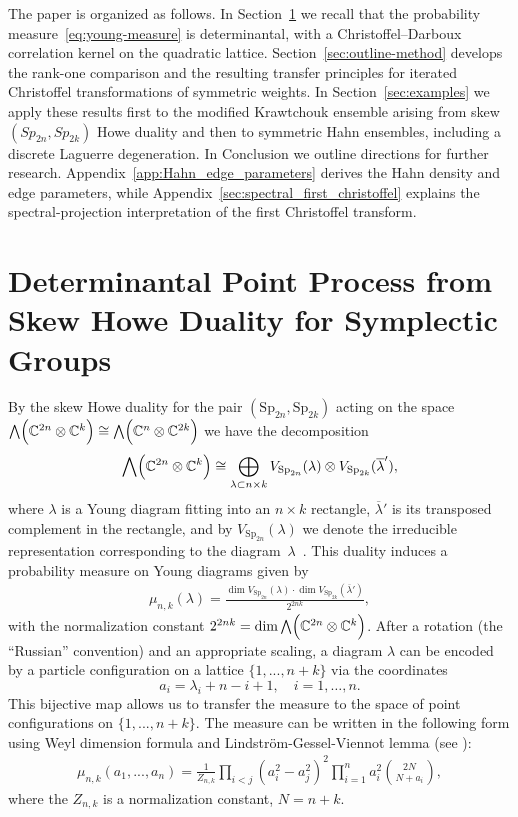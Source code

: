 \documentclass[reqno,11pt]{amsart}
\newcommand{\Sp}{Sp}
\theoremstyle{plain}
\theoremstyle{definition}
\numberwithin{equation}{section}
\begin{document}
The paper is organized as follows. In Section~\ref{sec:determ-point-proc} we recall that the probability measure~\eqref{eq:young-measure} is determinantal, with a Christoffel--Darboux correlation kernel on the quadratic lattice. Section~\ref{sec:outline-method} develops the rank-one comparison and the resulting transfer principles for iterated Christoffel transformations of symmetric weights. In Section~\ref{sec:examples} we apply these results first to the modified Krawtchouk ensemble arising from skew $(\Sp_{2n},\Sp_{2k})$ Howe duality and then to symmetric Hahn ensembles, including a discrete Laguerre degeneration. In Conclusion we outline directions for further research.
Appendix~\ref{app:Hahn_edge_parameters} derives the Hahn density and edge parameters, while Appendix~\ref{sec:spectral_first_christoffel} explains the spectral-projection interpretation of the first Christoffel transform.

\section{Determinantal Point Process from Skew Howe Duality for Symplectic Groups}
\label{sec:determ-point-proc}

By the skew Howe duality for the pair \((\mathrm{Sp}_{2n},\mathrm{Sp}_{2k})\)  acting on the space 
$\bigwedge\Bigl(\mathbb{C}^{2n}\otimes\mathbb{C}^{k}\Bigr)
\cong
\bigwedge\Bigl(\mathbb{C}^{n}\otimes\mathbb{C}^{2k}\Bigr)$
we have the decomposition
\begin{align*}
\bigwedge\Bigl(\mathbb{C}^{2n}\otimes\mathbb{C}^{k}\Bigr)
\cong \bigoplus_{\lambda\subset n\times k} V_{\mathrm{Sp}_{2n}}(\lambda)\otimes V_{\mathrm{Sp}_{2k}}(\overline{\lambda}'),
\end{align*}
where \(\lambda\) is a Young diagram fitting into an \(n\times k\) rectangle, $\overline\lambda'$ is its transposed
complement in the rectangle, and by $V_{\text{Sp}_{2n}}(\lambda)$ we denote
the irreducible representation corresponding to the diagram~$\lambda$~\cite{howe1995perspectives,cheng2012dualities}. This duality induces a probability measure on Young diagrams given by
\begin{align}
\mu_{n,k}(\lambda) = \frac{\dim V_{\mathrm{Sp}_{2n}}(\lambda)\cdot\dim V_{\mathrm{Sp}_{2k}}(\overline{\lambda}')}{2^{2nk}},
\label{eq:young-measure}
\end{align}
with the normalization constant \(2^{2nk}=\dim \bigwedge\Bigl(\mathbb{C}^{2n}\otimes\mathbb{C}^{k}\Bigr)\). After a rotation (the “Russian” convention) and an appropriate scaling, a diagram \(\lambda\) can be encoded by a particle configuration on a lattice
$\{1,...,n+k\}$ 
via the coordinates
$$
a_i = \lambda_i + n - i + 1,\quad i=1,\dots,n.
$$
This bijective map allows us to transfer the measure to the space of point configurations on $\{1,...,n+k\}$.
The measure can be written in the following form using Weyl dimension formula and Lindstr\"om-Gessel-Viennot lemma (see \cite{NNP20}):  
\begin{align}
	\mu_{n,k}(a_1,...,a_n)=\frac{1}{Z_{n,k}}\prod\limits_{i<j}(a_i^2-a_j^2)^2\prod\limits_{i=1}^n a_i^2\binom{2N}{N+a_i},
\end{align}
where the $Z_{n,k}$ is a normalization constant, $N=n+k$. 
\end{document}
